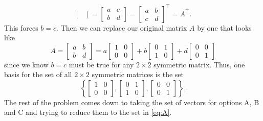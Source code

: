 \begin{questions}
\begin{solution}
\[\begin{bmatrix}
      \end{bmatrix}
      =
      \begin{bmatrix}
        a&c\\b&d
      \end{bmatrix}
      =
      \begin{bmatrix}
        a&b\\c&d
      \end{bmatrix}^{\intercal} =A^{\intercal}.
    \]
    This forces $b=c$. Then we can replace our original matrix $A$ by one
    that looks like
    \[
      A=\begin{bmatrix}
        a&b\\
        b&d
      \end{bmatrix}= a\begin{bmatrix}
        1&0\\
        0&0
      \end{bmatrix}+ b\begin{bmatrix}
        0&1\\
        1&0
      \end{bmatrix}+ d\begin{bmatrix}
        0&0\\
        0&1
      \end{bmatrix}
    \]
    since we know $b=c$ must be true for any $2\times 2$ symmetric matrix.
    Thus, one basis for the set of all $2\times 2$ symmetric matrices is
    the set
    \[
      \label{eq:A}
      \tag{$\star$} \left\{
        \begin{bmatrix}1&0\\0&0\end{bmatrix},
        \begin{bmatrix}0&1\\1&0\end{bmatrix},
        \begin{bmatrix}0&0\\0&1\end{bmatrix} \right\}.
    \]
    The rest of the problem comes down to taking the set of vectors for
    options A, B and C and trying to reduce them to the set in
    \eqref{eq:A}.
  \end{solution}


\end{questions}
